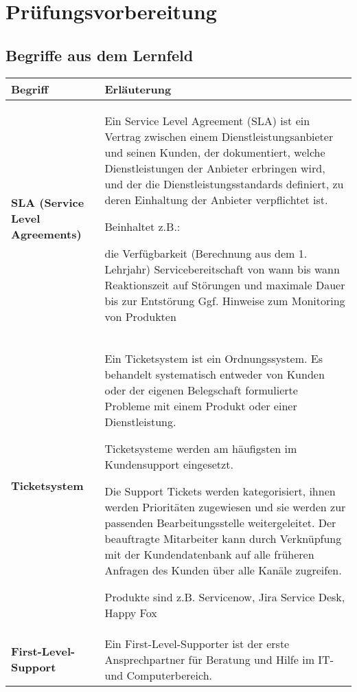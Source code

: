 \documentclass[asp1.tex]{subfiles}
\begin{document}
\section{Prüfungsvorbereitung}

\subsection{Begriffe aus dem Lernfeld}

\begin{longtable}{|p{}|p{}|}
        \hline

        \textbf{Begriff} & \textbf{Erläuterung} \\\hline

        \textbf{SLA (Service Level Agreements)} &

        Ein Service Level Agreement (SLA) ist ein Vertrag zwischen einem Dienstleistungsanbieter und seinen Kunden, der dokumentiert, welche Dienstleistungen der Anbieter erbringen wird, und der die Dienstleistungsstandards definiert, zu deren Einhaltung der Anbieter verpflichtet ist.

        Beinhaltet z.B.:
        \begin{outline}
            \1 die Verfügbarkeit (Berechnung aus dem 1. Lehrjahr)
            \1 Servicebereitschaft von wann bis wann
            \1 Reaktionszeit auf Störungen und maximale Dauer bis zur Entstörung
            \1 Ggf. Hinweise zum Monitoring von Produkten
        \end{outline}
        \\\hline

        \textbf{Ticketsystem} &
        Ein Ticketsystem ist ein Ordnungssystem. Es behandelt systematisch entweder von Kunden oder der eigenen Belegschaft formulierte Probleme mit einem Produkt oder einer Dienstleistung.

        Ticketsysteme werden am häufigsten im Kundensupport eingesetzt.

        Die Support Tickets werden kategorisiert, ihnen werden Prioritäten zugewiesen und sie werden zur passenden Bearbeitungsstelle weitergeleitet. Der beauftragte Mitarbeiter kann durch Verknüpfung mit der Kundendatenbank auf alle früheren Anfragen des Kunden über alle Kanäle zugreifen.

        Produkte sind z.B. Servicenow, Jira Service Desk, Happy Fox
        \\\hline

        \textbf{First-Level-Support} &
        Ein First-Level-Supporter ist der erste Ansprechpartner für Beratung und Hilfe im IT- und Computerbereich.


\end{longtable}
\end{document}

